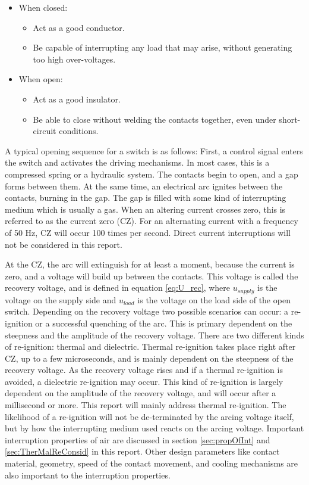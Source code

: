 \documentclass[10pt,b5paper,twoside]{article}
\begin{document}
\begin{itemize}
\item When closed:
	\begin{itemize}
		\item Act as a good conductor.
		\item Be capable of interrupting any load that may arise, without generating too high over-voltages. 
	\end{itemize}
\item When open:
	\begin{itemize}
		\item Act as a good insulator.
		\item Be able to close without welding the contacts together, even under short-circuit conditions.
	\end{itemize}
\end{itemize}

A typical opening sequence for a switch is as follows: First, a control signal enters the switch and activates the driving mechanisms. In most cases, this is a compressed spring or a hydraulic system. The contacts begin to open, and a gap forms between them. At the same time, an electrical arc ignites between the contacts, burning in the gap. The gap is filled with some kind of interrupting medium which is usually a gas. When an altering current crosses zero, this is referred to as the current zero (CZ). For an alternating current with a frequency of 50 Hz, CZ will occur 100 times per second. Direct current interruptions will not be considered in this report.


At the CZ, the arc will extinguish for at least a moment, because the current is zero, and a voltage will build up between the contacts. This voltage is called the recovery voltage, and is defined in equation \eqref{eq:U_rec}, where $u_{supply}$ is the voltage on the supply side and $u_{load}$ is the voltage on the load side of the open switch. Depending on the recovery voltage two possible scenarios can occur: a re-ignition or a successful quenching of the arc. This is primary dependent on the steepness and the amplitude of the recovery voltage. There are two different kinds of re-ignition: thermal and dielectric. Thermal re-ignition takes place right after CZ, up to a few microseconds, and is mainly dependent on the steepness of the recovery voltage. As the recovery voltage rises and if a thermal re-ignition is avoided, a dielectric re-ignition may occur. This kind of re-ignition is largely dependent on the amplitude of the recovery voltage, and will occur after a millisecond or more. This report will mainly address thermal re-ignition. The likelihood of a re-ignition  will not be de-terminated by the arcing voltage itself, but by how the interrupting medium used reacts on the arcing voltage. Important interruption properties of air are discussed in section \ref{sec:propOfInt} and \ref{sec:TherMalReConsid} in this report. Other design parameters like contact material, geometry, speed of the contact movement, and cooling mechanisms are also important to the interruption properties.
\end{document}
